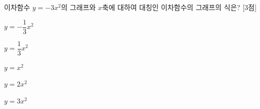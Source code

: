 이차함수 $y=-3x^2$의 그래프와 $x$축에 대하여 대칭인 이차함수의 그래프의 식은? \mbox{[3점]}
\begin{choices32}{\rule[-3ex]{0pt}{8ex}$y=-\dfrac{1}{3}x^2$}{\rule[-3ex]{0pt}{8ex}$y=\dfrac{1}{3}x^2$}{\rule[-3ex]{0pt}{8ex}$y=x^2$}{\rule[-3ex]{0pt}{8ex}$y=2x^2$}{\rule[-3ex]{0pt}{8ex}$y=3x^2$}\end{choices32}
